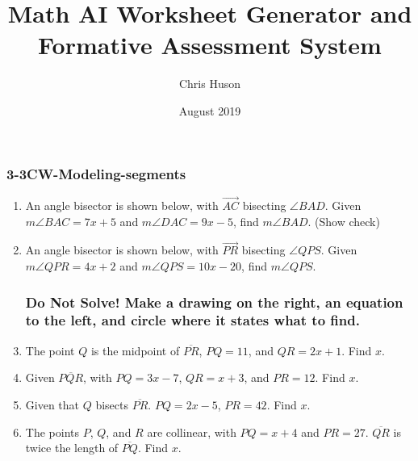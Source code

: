 \documentclass[12pt, twoside]{article}
\title{Math AI Worksheet Generator and Formative Assessment System}
\author{Chris Huson}
\date{August 2019}
\begin{document}
\subsubsection*{3-3CW-Modeling-segments}
\begin{enumerate}
\item An angle bisector is shown below, with $\overrightarrow{AC}$ bisecting $\angle BAD$. Given $m\angle BAC = 7x+5$ and $m\angle DAC = 9x-5$, find $m\angle BAD$. (Show check)
    \begin{flushright}
    \end{flushright} \vspace{3cm}

\item An angle bisector is shown below, with $\overrightarrow{PR}$ bisecting $\angle QPS$. Given $m\angle QPR = 4x+2$ and $m\angle QPS = 10x-20$, find $m\angle QPS$.
    \begin{flushright}
    \end{flushright}

\newpage   
  \subsubsection*{Do Not Solve! Make a drawing on the right, an equation to the left, and circle where it states what to find.}
  \vspace{0.5cm}

\item The point $Q$ is the midpoint of $\overline{PR}$, $PQ=11$, and $QR=2x+1$. Find ${x}$.
\vspace{4cm}

\item Given $\overline{PQR}$, with $PQ=3x-7$, $QR=x+3$, and $PR=12$. Find ${x}$.
\vspace{4cm}

\item Given that $Q$ bisects $\overline{PR}$. $PQ=2x-5$, $PR=42$. Find ${x}$.
\vspace{4cm}

\item The points $P$, $Q$, and $R$ are collinear, with $PQ=x+4$ and $PR=27$. $\overline{QR}$ is twice the length of $\overline{PQ}$. Find ${x}$.




\end{enumerate}
\end{document}
